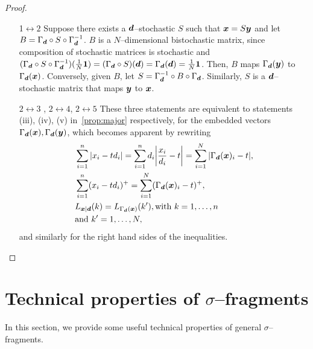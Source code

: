 \begin{proof}$ $\vspace{-12pt}\\
\begin{enumerate}
	\item[1$\leftrightarrow2$]
	Suppose there exists a $\bm{d}$--stochastic $S$ such that $\bm{x} = S\bm{y}$ and let $B = \Gamma_{\bm{d}} \circ S \circ \Gamma_{\bm{d}}^{-1}$.
$B$ is a $N$--dimensional bistochastic matrix, since composition of stochastic matrices is stochastic and $(\Gamma_{\bm{d}} \circ S \circ \Gamma_{\bm{d}}^{-1}) (\frac{1}{N}\bm{1}) = (\Gamma_{\bm{d}} \circ S) (\bm{d}) = \Gamma_{\bm{d}}(\bm{d}) = \frac{1}{N}\bm{1}$. Then, $B$ maps $\Gamma_{\bm{d}}({\bm{y}})$ to $\Gamma_{\bm{d}}({\bm{x}})$.
	Conversely, given $B$, let $S = \Gamma_{\bm{d}}^{-1} \circ B \circ \Gamma_{\bm{d}}$.
	Similarly, $S$ is a $\bm{d}$--stochastic matrix that maps $\bm{y}$ to $\bm{x}$.
	\item[$2\leftrightarrow3$]\hspace{-5pt}, $2\leftrightarrow4$, $2\leftrightarrow5$ These three statements are equivalent to statements (iii), (iv), (v) in~\cref{prop:major} respectively, for the embedded vectors $\Gamma_{\bm{d}}({\bm{x}}), \Gamma_{\bm{d}}({\bm{y}})$, which becomes apparent by rewriting
	\begin{align*}
	&\sum\limits_{i=1}^n \abs{x_i - t d_i} = \sum\limits_{i=1}^n d_i \abs{\frac{x_i}{d_i} - t} = \sum\limits_{i=1}^N \abs{\Gamma_{\bmd}(\bmx)_i - t}, \\
	&\sum\limits_{i=1}^n (x_i - t d_i)^+ = \sum\limits_{i=1}^N (\Gamma_{\bmd}(\bmx)_i - t)^+, \\
	&L_{\bmx|\bmd}(k) = L_{\Gamma_{\bmd}(\bmx)}(k'), \text{with}\ k=1,\dots,n\ \\
	&\text{and}\ k'=1,\dots,N, \nonumber
	\end{align*} 
and similarly for the right hand sides of the inequalities.
\end{enumerate}
\vspace{-19pt}
\end{proof}


\section{Technical properties of $\sigma$--fragments}
\label{app:frag}

In this section, we provide some useful technical properties of general $\sigma$--fragments.

